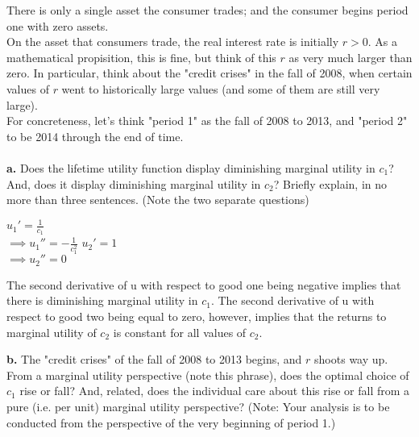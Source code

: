 \documentclass[11pt]{SelfArxOneColBMN}
\begin{document}
There is only a single asset the consumer trades; and the consumer begins period one with zero assets.\\
On the asset that consumers trade, the real interest rate is initially $r > 0$. As a mathematical propisition, this is fine, but think of this $r$ as very much larger than zero. In particular, think about the "credit crises" in the fall of 2008, when certain values of $r$ went to historically large values (and some of them are still very large).\\
For concreteness, let's think "period 1" as the fall of 2008 to 2013, and "period 2" to be 2014 through the end of time.\\
\\
\noindent \textbf{a.} Does the lifetime utility function display diminishing marginal utility in $c_1$? And, does it display diminishing marginal utility in $c_2$? Briefly explain, in no more than three sentences. (Note the two separate questions)\\
\begin{solution}
  \begin{center}
    $u_1' = \frac{1}{c_1}$\\
    $\implies u_1'' = -\frac{1}{c_1^2}$
    $u_2' = 1$\\
    $\implies u_2'' = 0$
  \end{center}
  The second derivative of u with respect to good one being negative implies that there is diminishing marginal utility in $c_1$. The second derivative of u with respect to good two being equal to zero, however, implies that the returns to marginal utility of $c_2$ is constant for all values of $c_2$.
\end{solution}
\noindent \textbf{b.} The "credit crises" of the fall of 2008 to 2013 begins, and $r$ shoots way up. From a marginal utility perspective (note this phrase), does the optimal choice of $c_1$ rise or fall? And, related, does the individual care about this rise or fall from a pure (i.e. per unit) marginal utility perspective? (Note: Your analysis is to be conducted from the perspective of the very beginning of period 1.)\\
\end{document}
